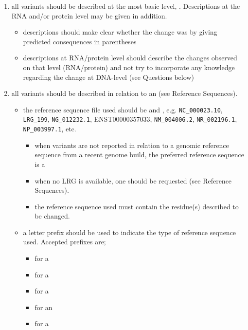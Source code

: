 \begin{enumerate}
	\item all variants should be described at the most basic level, . Descriptions at the RNA and/or protein level may be given in addition. 
	
	\begin{itemize}
		\item descriptions should make clear whether the change was  by giving predicted consequences in parentheses
		\item descriptions at RNA/protein level should describe the changes observed on that level (RNA/protein) and not try to incorporate any knowledge regarding the change at DNA-level (see Questions below)
	\end{itemize}
	
	\item all variants should be described in relation to an  (see Reference Sequences). 
	
	\begin{itemize}
		\item the reference sequence file used should be  and , e.g. \verb|NC_000023.10|, \verb|LRG_199|, \verb|NG_012232.1|, ENST00000357033, \verb|NM_004006.2|, \verb|NR_002196.1|, \verb|NP_003997.1|, etc. 
		\begin{itemize}
			\item when variants are not reported in relation to a genomic reference sequence from a recent genome build, the preferred reference sequence is a 
			\item when no LRG is available, one should be requested (see Reference Sequences).
			\item the reference sequence used must contain the residue(s) described to be changed.
		\end{itemize}
	
		\item a letter prefix should be used to indicate the type of reference sequence used. Accepted prefixes are; 
		\begin{itemize}
			\item {} for a 
			\item {} for a 
			\item {} for a 
			\item {} for an 
			\item {} for a 
		\end{itemize}
	

\end{itemize}
\end{enumerate}
